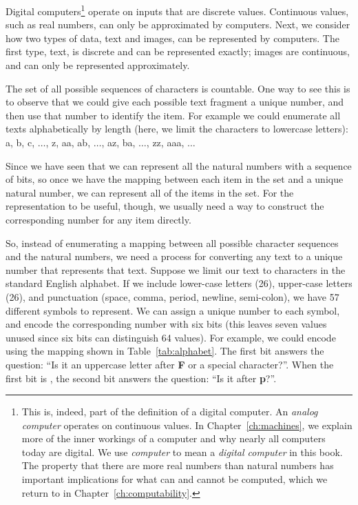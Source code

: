 Digital computers\footnote{This is, indeed, part of the definition of a digital computer.  An \emph{analog computer} operates on continuous values. In Chapter~\ref{ch:machines}, we explain more of the inner workings of a computer and why nearly all computers today are digital.  We use \emph{computer} to mean a \emph{digital computer} in this book. The property that there are more real numbers than natural numbers has important implications for what can and cannot be computed, which we return to in Chapter~\ref{ch:computability}.} operate on inputs that are discrete values.  Continuous values, such as real numbers, can only be approximated by computers.  Next, we consider how two types of data, text and images, can be represented by computers.  The first type, text, is discrete and can be represented exactly; images are continuous, and can only be represented approximately.

 The set of all possible sequences of characters is countable.  One way to see this is to observe that we could give each possible text fragment a unique number, and then use that number to identify the item.  For example we could enumerate all texts alphabetically by length (here, we limit the characters to lowercase letters):
{\sf a}, {\sf b}, {\sf c}, $\ldots$, {\sf z}, {\sf aa}, {\sf ab}, $\ldots$, {\sf az}, {\sf ba}, $\ldots$, {\sf zz}, {\sf aaa}, $\ldots$

Since we have seen that we can represent all the natural numbers with a sequence of bits, so once we have the mapping between each item in the set and a unique natural number, we can represent all of the items in the set.  For the representation to be useful, though, we usually need a way to construct the corresponding number for any item directly.

So, instead of enumerating a mapping between all possible character sequences and the natural numbers, we need a process for converting any text to a unique number that represents that text.  Suppose we limit our text to characters in the standard English alphabet.  If we include lower-case letters (26), upper-case letters (26), and punctuation (space, comma, period, newline, semi-colon), we have 57 different symbols to represent.  We can assign a unique number to each symbol, and encode the corresponding number with six bits (this leaves seven values unused since six bits can distinguish 64 values).  For example, we could encode using the mapping shown in Table~\ref{tab:alphabet}.  The first bit answers the question: ``Is it an uppercase letter after {\bf F} or a special character?''.  When the first bit is , the second bit answers the question: ``Is it after {\bf p}?''.

